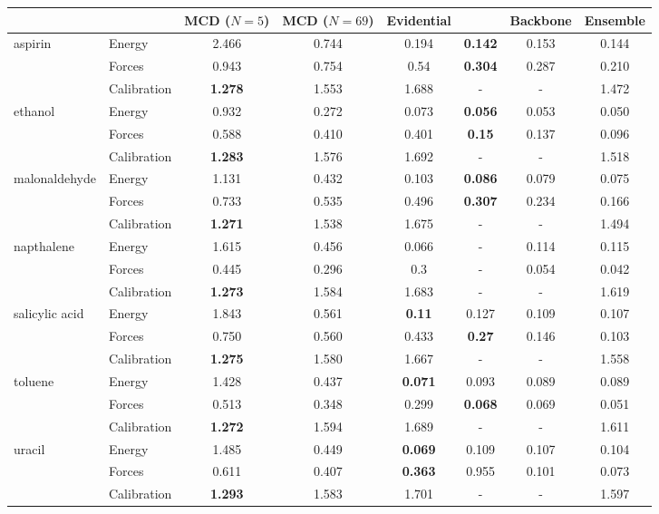 \begin{tabular}{llcccc|c|c}
\toprule
{} & & MCD ($N=5$) & MCD ($N=69$) & Evidential & \oursacro{} & Backbone & Ensemble\\
\midrule
\multirow{3}{*}{aspirin} & Energy & 2.466 & 0.744 & 0.194 & \textbf{0.142} & 0.153 & 0.144\\ & Forces & 0.943 & 0.754 & 0.54 & \textbf{0.304} & 0.287 & 0.210\\ & Calibration & \textbf{1.278} & 1.553 & 1.688 & - & - & 1.472\\
\midrule
\multirow{3}{*}{ethanol} & Energy & 0.932 & 0.272 & 0.073 & \textbf{0.056} & 0.053 & 0.050\\ & Forces & 0.588 & 0.410 & 0.401 & \textbf{0.15} & 0.137 & 0.096\\ & Calibration & \textbf{1.283} & 1.576 & 1.692 & - & - & 1.518\\
\midrule
\multirow{3}{*}{malonaldehyde} & Energy & 1.131 & 0.432 & 0.103 & \textbf{0.086} & 0.079 & 0.075\\ & Forces & 0.733 & 0.535 & 0.496 & \textbf{0.307} & 0.234 & 0.166\\ & Calibration & \textbf{1.271} & 1.538 & 1.675 & - & - & 1.494\\
\midrule
\multirow{3}{*}{napthalene} & Energy & 1.615 & 0.456 & 0.066 & - & 0.114 & 0.115\\ & Forces & 0.445 & 0.296 & 0.3 & - & 0.054 & 0.042\\ & Calibration & \textbf{1.273} & 1.584 & 1.683 & - & - & 1.619\\
\midrule
\multirow{3}{*}{salicylic acid} & Energy & 1.843 & 0.561 & \textbf{0.11} & 0.127 & 0.109 & 0.107\\ & Forces & 0.750 & 0.560 & 0.433 & \textbf{0.27} & 0.146 & 0.103\\ & Calibration & \textbf{1.275} & 1.580 & 1.667 & - & - & 1.558\\
\midrule
\multirow{3}{*}{toluene} & Energy & 1.428 & 0.437 & \textbf{0.071} & 0.093 & 0.089 & 0.089\\ & Forces & 0.513 & 0.348 & 0.299 & \textbf{0.068} & 0.069 & 0.051\\ & Calibration & \textbf{1.272} & 1.594 & 1.689 & - & - & 1.611\\
\midrule
\multirow{3}{*}{uracil} & Energy & 1.485 & 0.449 & \textbf{0.069} & 0.109 & 0.107 & 0.104\\ & Forces & 0.611 & 0.407 & \textbf{0.363} & 0.955 & 0.101 & 0.073\\ & Calibration & \textbf{1.293} & 1.583 & 1.701 & - & - & 1.597\\
\bottomrule
\end{tabular}